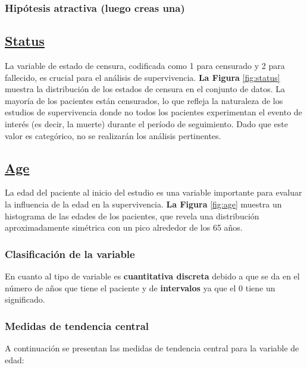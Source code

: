 \documentclass[a4paper,12pt]{article}
\begin{document}
    \subsubsection*{Hipótesis atractiva (luego creas una)}

    \subsection*{\underline{Status}}

    La variable de estado de censura, codificada como 1 para censurado y 2 para fallecido, es crucial para el análisis de supervivencia. \textbf{La Figura }\ref{fig:status} muestra la distribución de los estados de censura en el conjunto de datos. La mayoría de los pacientes están censurados, lo que refleja la naturaleza de los estudios de supervivencia donde no todos los pacientes experimentan el evento de interés (es decir, la muerte) durante el período de seguimiento. Dado que este valor es categórico, no se realizarán los análisis pertinentes.    

    \subsection*{\underline{Age}}

    La edad del paciente al inicio del estudio es una variable importante para evaluar la influencia de la edad en la supervivencia. \textbf{La Figura }\ref{fig:age} muestra un histograma de las edades de los pacientes, que revela una distribución aproximadamente simétrica con un pico alrededor de los 65 años.
	
    \subsubsection*{Clasificación de la variable}

    En cuanto al tipo de variable es \textbf{cuantitativa discreta} debido a que se da en el número de años que tiene el paciente y de \textbf{intervalos} ya que el 0 tiene un significado.    

    \subsubsection*{Medidas de tendencia central}

    A continuación se presentan las medidas de tendencia central para la variable de edad:
    
\end{document}
